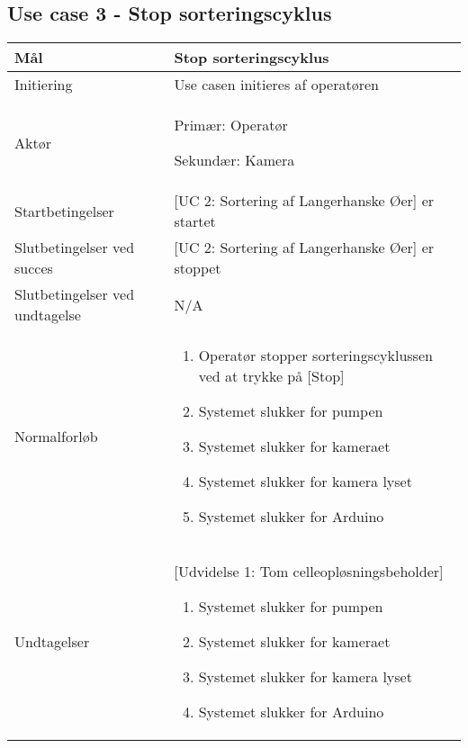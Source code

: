 \subsection{Use case 3 - Stop sorteringscyklus}
\label{uc:3}
\begin{center}
		\begin{longtable}{ | m{4cm} | m{8cm}| } 
			\hline
			Mål & Stop sorteringscyklus \\ 
			\hline
			Initiering &  Use casen initieres af operatøren\\
			\hline
			Aktør & Primær: Operatør
			
			 Sekundær: Kamera \\ 
			\hline
			Startbetingelser & [UC 2: Sortering af Langerhanske Øer] er startet\\ 
			\hline	
			Slutbetingelser ved succes & [UC 2: Sortering af Langerhanske Øer] er stoppet \\
			\hline
			Slutbetingelser ved undtagelse & N/A \\
			\hline
			Normalforløb & \begin{enumerate}
				\item Operatør stopper sorteringscyklussen ved at trykke på [Stop]
				\subitem [Udvidelse 1: Tom celleopløsningsbeholder]
				\item Systemet slukker for pumpen
				\item Systemet slukker for kameraet
				\item Systemet slukker for kamera lyset
				\item Systemet slukker for Arduino
			\end{enumerate} \\ 
			\hline
			Undtagelser & [Udvidelse 1: Tom celleopløsningsbeholder]
			
			\begin{enumerate}
			\item Systemet slukker for pumpen
			\item Systemet slukker for kameraet
			\item Systemet slukker for kamera lyset
			\item Systemet slukker for Arduino
			\end{enumerate} \\
			\hline
		\end{longtable}
		
	\end{center}
	\pagebreak